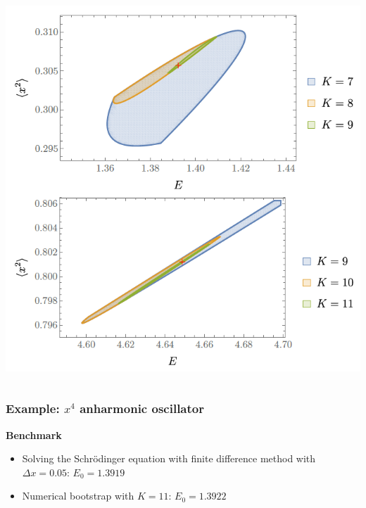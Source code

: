 \documentclass{beamer}
\begin{document}
\begin{frame}[fragile]
\begin{columns}
    \begin{column}{0.5\textwidth}
        \includegraphics[width=\textwidth]{oscillator-bootstrap-feasible-domains.PNG}
    \end{column}
\end{columns} 

\end{frame}

\begin{frame}
\frametitle{Example: $x^4$ anharmonic oscillator}

\textbf{Benchmark}

\begin{itemize}
    \item Solving the Schr\"{o}dinger equation with finite difference method with $\Delta x = 0.05$: $E_0 = 1.3919$
    \item Numerical bootstrap with $K=11$: $E_0 = 1.3922$
\end{itemize}  

\end{frame}
\end{document}

